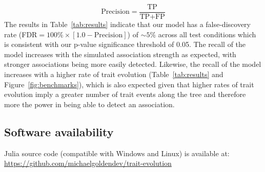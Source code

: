 \documentclass[]{article}
\begin{document}
\begin{equation}
\text{Precision}=\frac{\text{TP}}{\text{TP}+\text{FP}}
\end{equation}
The results in Table~\ref{tab:results} indicate that our model has a false-discovery rate (FDR$=100\% \times [1.0 - \text{Precision}]$) of $\sim5\%$ across all test conditions which is consistent with our p-value significance threshold of 0.05. The recall of the model increases with the simulated association strength as expected, with stronger associations being more easily detected. Likewise, the recall of the model increases with a higher rate of trait evolution (Table~\ref{tab:results} and Figure~\ref{fig:benchmarks}), which is also expected given that higher rates of trait evolution imply a greater number of trait events along the tree and therefore more the power in being able to detect an association.

\subsection*{Software availability}
Julia source code (compatible with Windows and Linux) is available at:\\ \href{https://github.com/michaelgoldendev/trait-evolution}{https://github.com/michaelgoldendev/trait-evolution}

\end{document}
